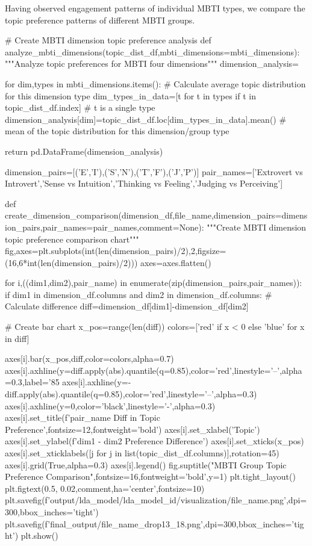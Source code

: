 \documentclass[12pt]{article}
\numberwithin{figure}{section}  %
\begin{document}
	Having observed engagement patterns of individual MBTI types, we compare the
	topic preference patterns of different MBTI groups.
	\begin{python}
# Create MBTI dimension topic preference analysis
def analyze_mbti_dimensions(topic_dist_df,mbti_dimensions=mbti_dimensions):
    """Analyze topic preferences for MBTI four dimensions"""
    dimension_analysis={}
    
    for dim,types in mbti_dimensions.items():
        # Calculate average topic distribution for this dimension type
        dim_types_in_data=[t for t in types if t in topic_dist_df.index] # t is a single type
        dimension_analysis[dim]=topic_dist_df.loc[dim_types_in_data].mean() # mean of the topic distribution for this dimension/group type
    
    return pd.DataFrame(dimension_analysis)

dimension_pairs=[('E','I'),('S','N'),('T','F'),('J','P')]
pair_names=['Extrovert vs Introvert','Sense vs Intuition','Thinking vs Feeling','Judging vs Perceiving']
    

def create_dimension_comparison(dimension_df,file_name,dimension_pairs=dimension_pairs,pair_names=pair_names,comment=None):
    """Create MBTI dimension topic preference comparison chart"""
    fig,axes=plt.subplots(int(len(dimension_pairs)/2),2,figsize=(16,6*int(len(dimension_pairs)/2)))
    axes=axes.flatten()
        
    for i,((dim1,dim2),pair_name) in enumerate(zip(dimension_pairs,pair_names)):
        if dim1 in dimension_df.columns and dim2 in dimension_df.columns:
            # Calculate difference
            diff=dimension_df[dim1]-dimension_df[dim2]
            
            # Create bar chart
            x_pos=range(len(diff))
            colors=['red' if x < 0 else 'blue' for x in diff]
            
            axes[i].bar(x_pos,diff,color=colors,alpha=0.7)
            axes[i].axhline(y=diff.apply(abs).quantile(q=0.85),color='red',linestyle='--',alpha=0.3,label='85%
            axes[i].axhline(y=-diff.apply(abs).quantile(q=0.85),color='red',linestyle='--',alpha=0.3)
            axes[i].axhline(y=0,color='black',linestyle='-',alpha=0.3)
            axes[i].set_title(f'{pair_name} Diff in Topic Preference',fontsize=12,fontweight='bold')
            axes[i].set_xlabel('Topic')
            axes[i].set_ylabel(f'{dim1} - {dim2} Preference Difference')
            axes[i].set_xticks(x_pos)
            axes[i].set_xticklabels([j for j in list(topic_dist_df.columns)],rotation=45)
            axes[i].grid(True,alpha=0.3)
            axes[i].legend()
    fig.suptitle("MBTI Group Topic Preference Comparison",fontsize=16,fontweight='bold',y=1)
    plt.tight_layout()
    plt.figtext(0.5, 0.02,comment,ha='center',fontsize=10)
    plt.savefig(f'output/lda_model/lda_{model_id}/visualization/{file_name}.png',dpi=300,bbox_inches='tight')
    plt.savefig(f'final_output/{file_name}_drop13_18.png',dpi=300,bbox_inches='tight')
    plt.show()



\end{python}
\end{document}
